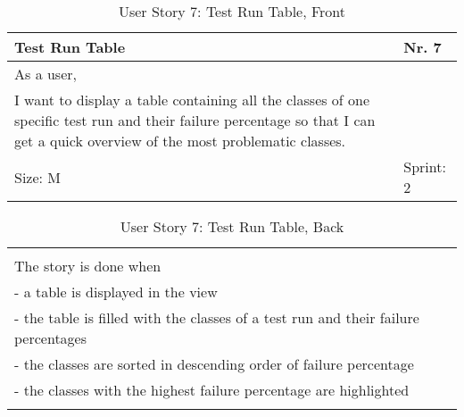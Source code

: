 \begin{table}[H]
  \caption{User Story 7: Test Run Table, Front}
  \label{Story_7_Front}
  \centering
  \begin{tabular}{|p{9cm} p{2cm}|}
	\hline  	
  	Test Run Table & Nr. 7 \\ 
  	\hline
  	As a user, &    \\ 
  	I want to display a table containing all the classes of one specific test run and their failure percentage so that I can get a quick overview of the most problematic classes. &    \\ 
  	Size: M & Sprint: 2 \\ 
  	\hline
  \end{tabular}
\end{table}
\begin{table}[H]
  \caption{User Story 7: Test Run Table, Back}
  \label{Story_7_Back}
  \centering
  \begin{tabular}{|p{10cm} p{1cm}|}
  \hline
  	  &    \\ 
  	The story is done when &    \\ 
  	 - a table is displayed in the view & \\ 
  	 - the table is filled with the classes of a test run and their failure percentages & \\ 
  	 - the classes are sorted in descending order of failure percentage & \\ 
  	 - the classes with the highest failure percentage are highlighted & \\  
  	 
  	  &  
  	   \\ 
  	\hline
  \end{tabular}
\end{table}

\ \\ 

